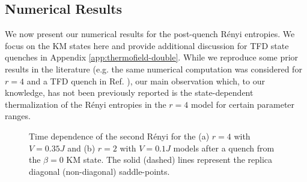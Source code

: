 \documentclass[reprint, floatfix,eqsecnum,superscriptaddress,preprint,nofootinbib,onecolumn,amsmath,amssymb,aps,prb]{revtex4-2}
\begin{document}
\subsection{Numerical Results}

We now present our numerical results for the post-quench R\'enyi entropies. We focus on the KM states here %
and provide additional discussion for TFD state quenches in Appendix \ref{app:thermofield-double}. 
While we reproduce some prior results in the literature (e.g. the same numerical computation was considered for $r=4$ and a TFD quench in Ref. \cite{Penington2019}), our main observation which, to our knowledge, has not been previously reported is the state-dependent thermalization of the R\'enyi entropies in the $r=4$ model for certain parameter ranges. 


\begin{figure}%
 \hspace{15mm}
  \caption{Time dependence of the second R\'enyi for the (a) $r=4$ with $V=0.35J$ and (b) $r=2$ with $V=0.1J$ models after a quench from the $\beta=0$ KM state. The solid (dashed) lines represent the replica diagonal (non-diagonal) saddle-points. 
  } 
  \label{fig:two-site-beta0}
\end{figure}
\end{document}
